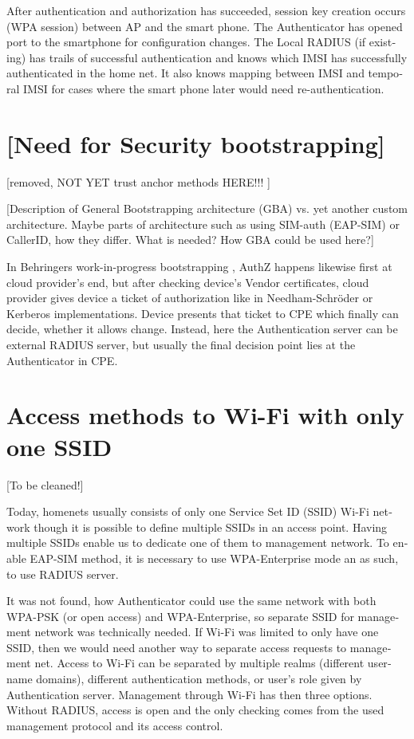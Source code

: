 \documentclass[12pt,a4paper,english]{tutthesis}
\begin{document}
\begin{otherlanguage}{english}
After authentication and authorization has succeeded, session key
creation occurs (WPA session) between AP and the smart phone. 
The Authenticator has opened port to the smartphone for
configuration changes. 
The Local RADIUS (if existing) has trails of successful
authentication and knows which IMSI has successfully authenticated in
the home net. It also knows mapping between IMSI and temporal IMSI for
cases where the smart phone later would need  re-authentication.



\section{[Need for Security bootstrapping]}
\label{sec-4-4}
[removed, NOT YET trust anchor methods HERE!!! ]



[Description of General Bootstrapping architecture (GBA) vs. yet
another custom architecture. Maybe parts of architecture
such as using SIM-auth (EAP-SIM) or CallerID, how they differ. 
What is needed? How GBA could be used here?]


In Behringers work-in-progress  bootstrapping \cite{draft-behringer-bootstrap},
AuthZ happens likewise first at cloud provider's
end, but after checking device's Vendor certificates, cloud provider
gives device a ticket of authorization like in Needham-Schröder or
Kerberos implementations. Device presents that ticket to CPE which
finally can decide, whether it allows change. 
Instead, here the Authentication server can be external RADIUS server,
but usually the final decision point lies at the Authenticator in CPE.


\section{Access methods to Wi-Fi with only one SSID}
\label{sec-4-5}

[To be cleaned!]

Today, homenets usually consists of only one Service Set ID (SSID)
Wi-Fi network though it is possible to define multiple SSIDs in
an access point. Having multiple SSIDs enable us to dedicate one of them
to management network. 
To enable EAP-SIM method, it is necessary to use WPA-Enterprise mode
an as such, to use RADIUS server.

It was not found, how Authenticator could use the same network with
both WPA-PSK (or open access) and WPA-Enterprise, so
separate SSID for management network was technically needed.
If Wi-Fi was limited to only have one SSID, then we would need another
way to separate access requests to management net.  Access to Wi-Fi
can be separated by multiple realms (different username domains),
different authentication methods, or user's role
given by Authentication server. Management through Wi-Fi has then three
options.  Without RADIUS, access is open and the only checking comes
from the used management protocol and its access control.


\end{otherlanguage}
\end{document}
